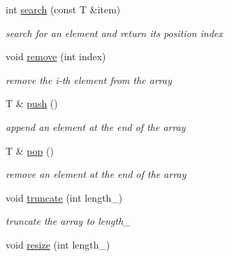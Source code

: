 \begin{DoxyCompactItemize}
\item 
int \hyperlink{class_magnum_1_1_array_a808b8020d2dcc64f478a1e162b4bbe48}{search} (const T \&item)
\begin{DoxyCompactList}\small\item\em search for an element and return its position index \end{DoxyCompactList}\item 
void \hyperlink{class_magnum_1_1_array_a822ed7443c1d07e9551759277f3ce28d}{remove} (int index)
\begin{DoxyCompactList}\small\item\em remove the i-\/th element from the array \end{DoxyCompactList}\item 
T \& \hyperlink{class_magnum_1_1_array_afe078a841d59338dd298eea1d4166cca}{push} ()
\begin{DoxyCompactList}\small\item\em append an element at the end of the array \end{DoxyCompactList}\item 
T \& \hyperlink{class_magnum_1_1_array_a7acae3f384476203f29accce90569fbc}{pop} ()
\begin{DoxyCompactList}\small\item\em remove an element at the end of the array \end{DoxyCompactList}\item 
void \hyperlink{class_magnum_1_1_array_a0482b28e22054fb968e07196315a3617}{truncate} (int length\+\_\+)\hypertarget{class_magnum_1_1_array_a0482b28e22054fb968e07196315a3617}{}\label{class_magnum_1_1_array_a0482b28e22054fb968e07196315a3617}

\begin{DoxyCompactList}\small\item\em truncate the array to length\+\_\+ \end{DoxyCompactList}\item 
void \hyperlink{class_magnum_1_1_array_a2d0a5782ceabe5f514df47e5ba2455e5}{resize} (int length\+\_\+)\hypertarget{class_magnum_1_1_array_a2d0a5782ceabe5f514df47e5ba2455e5}{}\label{class_magnum_1_1_array_a2d0a5782ceabe5f514df47e5ba2455e5}


\end{DoxyCompactItemize}
